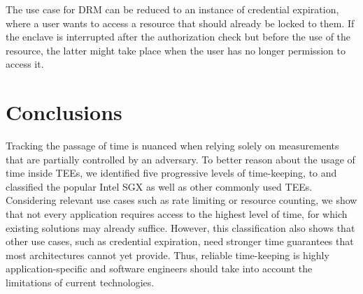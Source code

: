 \documentclass[sigplan,10pt]{acmart}
\begin{document}
The use case for DRM can be reduced to an instance of credential expiration,
where a user wants to access a resource that should already be locked to them.
If the enclave is interrupted after the authorization check but before the use
of the resource, the latter might take place when the user has no longer
permission to access it.









\section{Conclusions}
Tracking the passage of time is nuanced when relying solely on measurements that
are partially controlled by an adversary. To better reason about the usage of
time inside TEEs, we identified five progressive levels of time-keeping, \Tzero
to \Tfour and classified the popular Intel SGX as well as other commonly used
TEEs. Considering relevant use cases such as rate limiting or resource counting,
we show that not every application requires access to the highest level of time,
for which existing solutions may already suffice. However, this classification
also shows that other use cases, such as credential expiration, need stronger
time guarantees that most architectures cannot yet provide. Thus, reliable
time-keeping is highly application-specific and software engineers should take
into account the limitations of current technologies.
\end{document}
